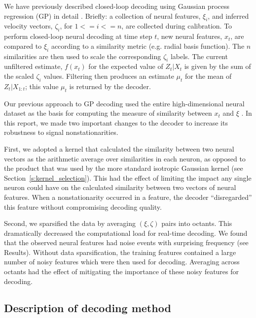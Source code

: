 We have previously described closed-loop decoding using Gaussian process regression (GP) in detail \cite{Brandman2018}. Briefly: a collection of neural features, $\xi_i$, and inferred velocity vectors, $\zeta_i$, for $1 <= i <= n$, are collected during calibration. To perform closed-loop neural decoding at time step $t$, new neural features, $x_t$, are compared to $\xi_i$ according to a similarity metric (e.g. radial basis function). The $n$ similarities are then used to scale the corresponding $\zeta_i$ labels.  The current unfiltered estimate, $f(x_t)$ for the expected value of $Z_t|X_t$ is given by the sum of the scaled $\zeta_i$ values.  Filtering then produces an estimate $\mu_t$ for the mean of $Z_t|X_{1:t}$; this value $\mu_t$ is returned by the decoder.

Our previous approach to GP decoding used the entire high-dimensional neural dataset as the basis for computing the measure of similarity between $x_t$ and $\xi$ \cite{Brandman2018}. In this report, we made two important changes to the decoder to increase its robustness to signal nonstationarities. 

First, we adopted a kernel that calculated the similarity between two neural vectors as the arithmetic average over similarities in each neuron, as opposed to the product that was used by the more standard isotropic Gaussian kernel (see Section~\ref{s:kernel_selection}).  This had the effect of limiting the impact any single neuron could have on the calculated similarity between two vectors of neural features. When a nonstationarity occurred in a feature, the decoder ``disregarded'' this feature without compromising decoding quality. 

Second, we sparsified the data by averaging $(\xi, \zeta)$ pairs into octants. This dramatically decreased the computational load for real-time decoding. We found that the observed neural features had noise events with surprising frequency (see Results). Without data sparsification, the training features contained a large number of noisy features which were then used for decoding. Averaging across octants had the effect of mitigating the importance of these noisy features for decoding.  


\subsection{Description of decoding method}

